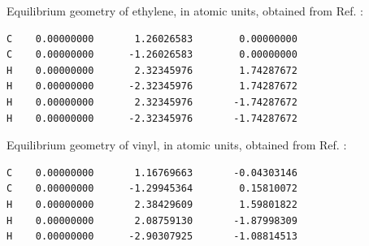 \documentclass[aip,jcp,preprint,noshowkeys,superscriptaddress]{revtex4-1}
\begin{document}
Equilibrium geometry of ethylene, in atomic units, obtained from Ref. :
\begin{singlespace}
\begin{verbatim}
C    0.00000000       1.26026583        0.00000000
C    0.00000000      -1.26026583        0.00000000
H    0.00000000       2.32345976        1.74287672
H    0.00000000      -2.32345976        1.74287672
H    0.00000000       2.32345976       -1.74287672
H    0.00000000      -2.32345976       -1.74287672
\end{verbatim}
\end{singlespace}

Equilibrium geometry of vinyl, in atomic units, obtained from Ref. :
\begin{singlespace}
\begin{verbatim}
C    0.00000000       1.16769663       -0.04303146
C    0.00000000      -1.29945364        0.15810072
H    0.00000000       2.38429609        1.59801822
H    0.00000000       2.08759130       -1.87998309
H    0.00000000      -2.90307925       -1.08814513
\end{verbatim}
\end{singlespace}

\clearpage

\end{document}
